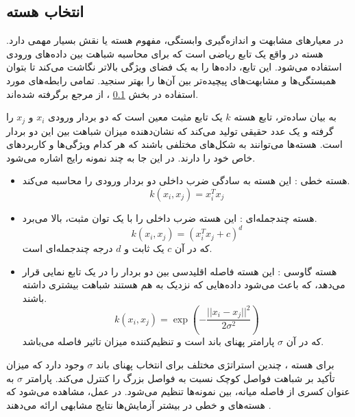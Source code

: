 \subsection{
	انتخاب هسته%
}\label{sec_kernel_selection}
در معیارهای مشابهت و اندازه‌گیری وابستگی، مفهوم هسته یا
نقش بسیار مهمی دارد. هسته در واقع یک تابع ریاضی است که برای محاسبه شباهت بین داده‌های ورودی استفاده می‌شود. این تابع، داده‌ها را به یک فضای ویژگی بالاتر نگاشت می‌کند تا بتوان همبستگی‌ها و مشابهت‌های پیچیده‌تر بین آن‌ها را بهتر سنجید.
تمامی رابطه‌های مورد استفاده در بخش
\ref{sec_kernel_selection}%
، از مرجع 
\cite{kornblith2019similarity} 
برگرفته شده‌اند.


به بیان ساده‌تر، تابع هسته \( k \) یک تابع مثبت معین است که دو بردار ورودی \( x_i \) و \( x_j \) را گرفته و یک عدد حقیقی تولید می‌کند که نشان‌دهنده میزان شباهت بین این دو بردار است. هسته‌ها می‌توانند به شکل‌های مختلفی باشند که هر کدام ویژگی‌ها و کاربردهای خاص خود را دارند. در این جا به چند نمونه رایج اشاره می‌شود.

\begin{itemize}
\item
هسته خطی%
:
این هسته به سادگی ضرب داخلی%
دو بردار ورودی را محاسبه می‌کند.
\begin{equation}
	k(x_i, x_j) = x_i^T x_j
\end{equation}
	
	
	
\item 
هسته چندجمله‌ای%
:
این هسته ضرب داخلی را با یک توان مثبت، بالا می‌برد.
\begin{equation}
	k(x_i, x_j) = (x_i^T x_j + c)^d
\end{equation}
که در آن \( c \) یک ثابت و \( d \) درجه چندجمله‌ای است.

	
\item
هسته گاوسی
%
:
این هسته فاصله اقلیدسی بین دو بردار را در یک تابع نمایی قرار می‌دهد، که باعث می‌شود داده‌هایی که نزدیک به هم هستند شباهت بیشتری داشته باشند.
\begin{equation}
	k(x_i, x_j) = \exp\left(-\frac{||x_i - x_j||^2}{2\sigma^2}\right)
\end{equation}
که در آن \( \sigma \) پارامتر پهنای باند است و تنظیم‌کننده میزان تاثیر فاصله می‌باشد.
\end{itemize}

برای هسته
%
، چندین استراتژی مختلف برای انتخاب پهنای باند \(\sigma\) وجود دارد که میزان تأکید بر شباهت فواصل کوچک نسبت به فواصل بزرگ را کنترل می‌کند. پارامتر \(\sigma\) به عنوان کسری از فاصله میانه، بین نمونه‌ها تنظیم می‌شود. در عمل، مشاهده می‌شود که هسته‌های
و خطی در بیشتر آزمایش‌ها نتایج مشابهی ارائه می‌دهند
\cite{kornblith2019similarity}.

